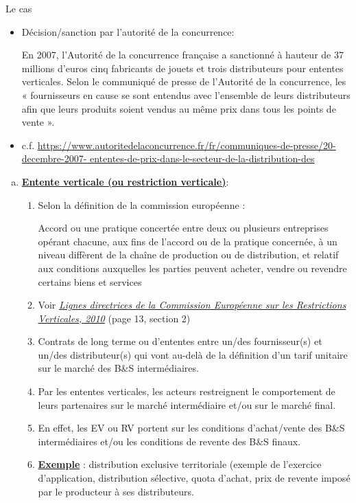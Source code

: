\begin{frame}[allowframebreaks]{Le cas}
    \begin{itemize}
        \item Décision/sanction par l'autorité de la concurrence:
    \begin{mdframed}
    En 2007, 
    l’Autorité de la concurrence française a sanctionné à hauteur de 37 millions
     d’euros cinq fabricants de jouets et trois distributeurs pour ententes verticales. 
     Selon le communiqué de presse de l’Autorité de la concurrence, les « fournisseurs en 
     cause se sont entendus avec l’ensemble de leurs distributeurs afin que leurs produits 
     soient vendus au même prix dans tous les points de vente ».
    \end{mdframed}
    \item c.f. 
    \url{https://www.autoritedelaconcurrence.fr/fr/communiques-de-presse/20-decembre-2007- ententes-de-prix-dans-le-secteur-de-la-distribution-des}
\end{itemize}
\framebreak
\begin{enumerate}[(a)]
    \item \underline{\textbf{Entente verticale (ou restriction verticale)}}: 
    \begin{enumerate}[$\star$]
        \item Selon la définition de la commission européenne :
    \begin{mdframed}
        Accord ou une pratique concertée entre deux ou plusieurs entreprises opérant chacune, 
        aux fins de l’accord ou de la pratique concernée, à un niveau diffèrent de la chaîne 
        de production ou de distribution, et relatif aux conditions 
        auxquelles les parties peuvent acheter, vendre ou revendre certains biens et services
    \end{mdframed}
    \item Voir 
    \href{https://eur-lex.europa.eu/legal-content/FR/TXT/PDF/?uri=CELEX:52010SC0411&from=FR}{
        \emph{Lignes directrices de la Commission Européenne sur les Restrictions Verticales, 2010}}
        (page 13, section 2)
    \item Contrats de long terme ou d’ententes entre un/des fournisseur(s) et un/des distributeur(s) 
    qui vont au-delà 
    de la définition d’un tarif unitaire sur le marché des B$\&$S intermédiaires. 
    \item Par les ententes verticales, les acteurs restreignent le comportement de leurs 
    partenaires sur le 
    marché intermédiaire et/ou sur le marché final.
    \item  En effet, les EV ou RV portent sur les conditions d’achat/vente des
     B$\&$S intermédiaires et/ou les conditions de revente des B$\&$S finaux.
    \item \textbf{\underline{Exemple}} : distribution exclusive territoriale
     (exemple de l’exercice d’application, distribution sélective, quota d’achat, 
     prix de revente imposé par le producteur à ses distributeurs.
\end{enumerate}


\end{enumerate}
\end{frame}
